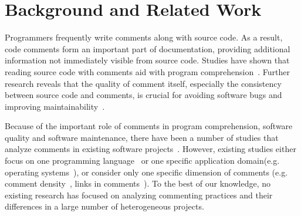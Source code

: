 \documentclass[sigconf,screen]{acmart}
\begin{document}
\section{Background and Related Work}
Programmers frequently write comments along with source code. As a result, code comments form an important part of documentation, providing additional information not immediately visible from source code. Studies have shown that reading source code with comments aid with program comprehension~\cite{Woodfield:1981:EMC:800078.802534,Tenny:1988:PRP:51199.51203}. 
Further research reveals that the quality of comment itself, especially the consistency between source code and comments, is crucial for avoiding software bugs and improving maintainability~\cite{Fluri2009Coevolution, Tan:2007:IBB:1294261.1294276}.

Because of the important role of comments in program comprehension, software quality and software maintenance, there have been a number of studies that analyze comments in existing software projects~\cite{2009ICSE-Listening,2009ICSECommentDensity,Fluri2009Coevolution,2011ESEM-CommentsInJava,2017MSR-ClassifyingJavaComment,2019Arxiv-LinksInComments}. However, existing studies either focus on one programming language~\cite{2011ESEM-CommentsInJava,2017MSR-ClassifyingJavaComment} or  one specific application domain(e.g. operating systems~\cite{2009ICSE-Listening}), or consider only one specific dimension of comments (e.g. comment density~\cite{2009ICSECommentDensity}, links in comments~\cite{2019Arxiv-LinksInComments}). To the best of our knowledge, no existing research has focused on analyzing commenting practices and their differences in a large number of heterogeneous projects.


\end{document}
